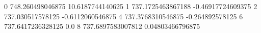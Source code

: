 0 748.260498046875 10.6187744140625
1 737.1725463867188 -0.46917724609375
2 737.030517578125 -0.6112060546875
4 737.3768310546875 -0.264892578125
6 737.6417236328125 0.0
8 737.6897583007812 0.04803466796875
